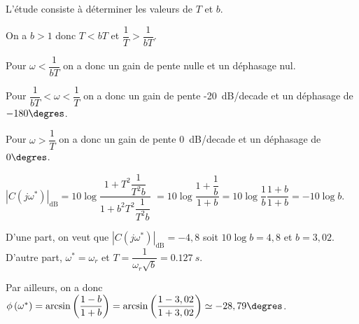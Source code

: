 L’étude consiste à déterminer les valeurs de $T$ et $b$.

\fi

\ifprof
\begin{corrige}
On a  $b>1$ donc $T<bT$ et $\dfrac{1}{T}>\dfrac{1}{bT}$. 

Pour $\omega<\dfrac{1}{bT}$ on a donc un gain de pente nulle et un déphasage nul. 

Pour $\dfrac{1}{bT}<\omega<\dfrac{1}{T}$ on a donc un gain de pente -\SI{20}{dB/decade} et un déphasage de $-180\degres$. 

Pour $\omega>\dfrac{1}{T}$ on a donc un gain de pente \SI{0}{dB/decade} et un déphasage de $0\degres$. 

\end{corrige}

\else
\fi


\ifprof
\begin{corrige}
 $\left| C\left(j\omega^{*}\right)\right|_{\text{dB}}= 10\log \dfrac{1+T^2 \dfrac{1}{T^2b}}{1+b^2T^2 \dfrac{1}{T^2b}}$ $= 10\log \dfrac{1+ \dfrac{1}{b}}{1+b}= 10\log \dfrac{1}{b}\dfrac{1+ b}{1+b}=-10\log b$.
\end{corrige}
\else
\fi




\ifprof
\begin{corrige}
D'une part, on veut que $\left| C\left(j\omega^{*}\right)\right|_{\text{dB}}=-4,8$ soit $10\log b=4,8$ et $b=3,02$.
D'autre part,  $\omega^{*}=\omega_r$ et $T=\dfrac{1}{\omega_r \sqrt{b}}=\SI{0,127}{s}$.

Par ailleurs, on a donc  $\phi\left(\omega^{*}\right)= \arcsin \left(\dfrac{1-b}{1+b}\right)= \arcsin \left(\dfrac{1-3,02}{1+3,02}\right) \simeq -28,79\degres $.
\end{corrige}
\else
\fi



